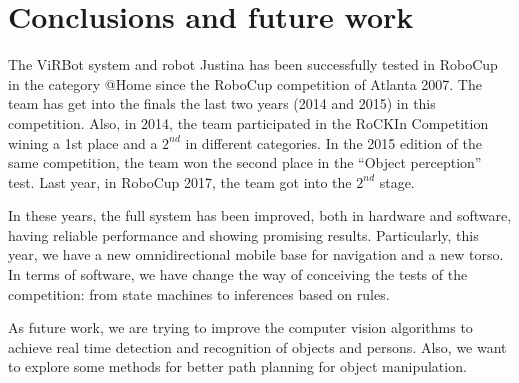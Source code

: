 \documentclass{llncs}
\begin{document}

\section{Conclusions and future work}\label{sec:conclusions}

The ViRBot system and robot Justina has been successfully tested in RoboCup in the category @Home since the RoboCup competition of Atlanta 2007. The team has get into the finals the last two years (2014 and 2015) in this competition. Also, in 2014, the team participated in the RoCKIn Competition wining a 1st place and a $2^{nd}$ in different categories. In the 2015 edition of the same competition, the team won the second place in the ``Object perception'' test. Last year, in RoboCup 2017, the team got into the $2^{nd}$ stage.

In these years, the full system has been improved, both in hardware and software, having reliable performance and showing promising results. Particularly, this year, we have a new omnidirectional mobile base for navigation and a new torso. In terms of software, we have change the way of conceiving the tests of the competition: from state machines to inferences based on rules.  

As future work, we are trying to improve the computer vision algorithms to achieve real time detection and recognition of objects and persons. Also, we want to explore some methods for better path planning for object manipulation.




\end{document}
